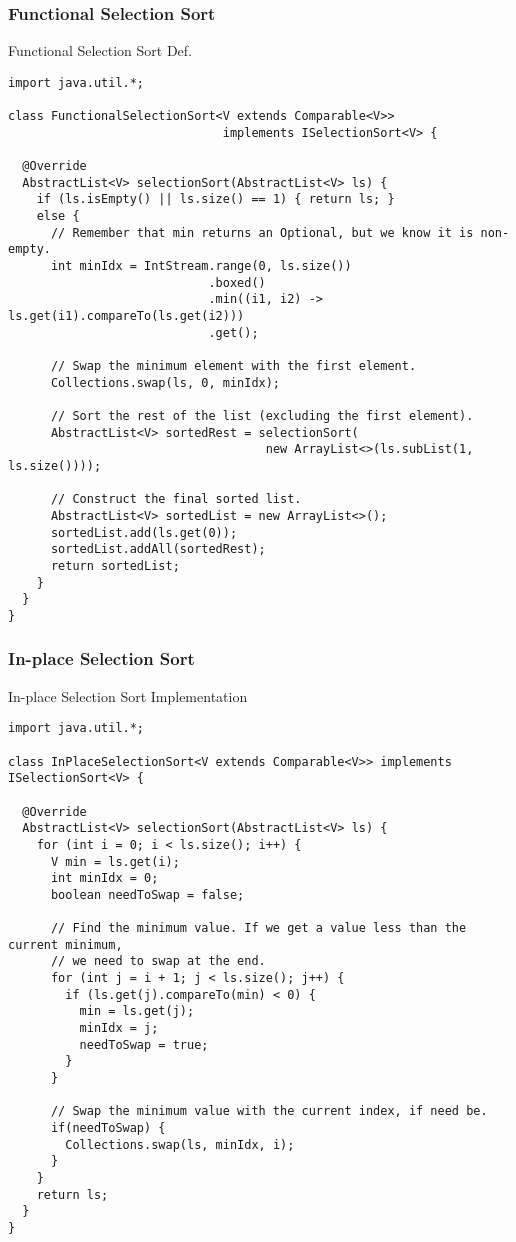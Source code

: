 \subsubsection*{Functional Selection Sort}
\begin{cl}[]{Functional Selection Sort Def.}
\begin{lstlisting}[language=MyJava]
import java.util.*;

class FunctionalSelectionSort<V extends Comparable<V>> 
                              implements ISelectionSort<V> {

  @Override
  AbstractList<V> selectionSort(AbstractList<V> ls) {
    if (ls.isEmpty() || ls.size() == 1) { return ls; }
    else {
      // Remember that min returns an Optional, but we know it is non-empty.
      int minIdx = IntStream.range(0, ls.size())
                            .boxed()
                            .min((i1, i2) -> ls.get(i1).compareTo(ls.get(i2)))
                            .get();

      // Swap the minimum element with the first element.
      Collections.swap(ls, 0, minIdx);

      // Sort the rest of the list (excluding the first element).
      AbstractList<V> sortedRest = selectionSort(
                                    new ArrayList<>(ls.subList(1, ls.size())));

      // Construct the final sorted list.
      AbstractList<V> sortedList = new ArrayList<>();
      sortedList.add(ls.get(0));
      sortedList.addAll(sortedRest);
      return sortedList;
    }
  }
}
\end{lstlisting}
\end{cl}

\subsubsection*{In-place Selection Sort}
\begin{cl}[]{In-place Selection Sort Implementation}
\begin{lstlisting}[language=MyJava]
import java.util.*;

class InPlaceSelectionSort<V extends Comparable<V>> implements ISelectionSort<V> {
  
  @Override
  AbstractList<V> selectionSort(AbstractList<V> ls) {
    for (int i = 0; i < ls.size(); i++) {
      V min = ls.get(i);
      int minIdx = 0;
      boolean needToSwap = false;

      // Find the minimum value. If we get a value less than the current minimum,
      // we need to swap at the end.
      for (int j = i + 1; j < ls.size(); j++) {
        if (ls.get(j).compareTo(min) < 0) {
          min = ls.get(j);
          minIdx = j;
          needToSwap = true;
        }
      }

      // Swap the minimum value with the current index, if need be.
      if(needToSwap) { 
        Collections.swap(ls, minIdx, i); 
      }
    }
    return ls;
  }
}
\end{lstlisting}  
\end{cl}


